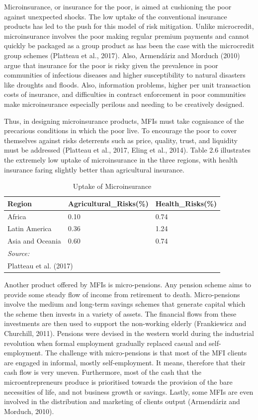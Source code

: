 \documentclass[a4paper, nobind]{templates/ociamthesis}
\begin{document}
Microinsurance, or insurance for the poor, is aimed at cushioning the poor against unexpected shocks. The low uptake of the conventional insurance products has led to the push for this model of risk mitigation. Unlike microcredit, microinsurance involves the poor making regular premium payments and cannot quickly be packaged as a group product as has been the case with the microcredit group schemes (Platteau et al., 2017). Also, Armendáriz and Morduch (2010) argue that insurance for the poor is risky given the prevalence in poor communities of infectious diseases and higher susceptibility to natural disasters like droughts and floods. Also, information problems, higher per unit transaction costs of insurance, and difficulties in contract enforcement in poor communities make microinsurance especially perilous and needing to be creatively designed.

Thus, in designing microinsurance products, MFIs must take cognisance of the precarious conditions in which the poor live. To encourage the poor to cover themselves against risks deterrents such as price, quality, trust, and liquidity must be addressed (Platteau et al., 2017, Eling et al., 2014). Table 2.6 illustrates the extremely low uptake of microinsurance in the three regions, with health insurance faring slightly better than agricultural insurance.

\begin{table}

\caption{\label{tab:unnamed-chunk-12}Uptake of Microinsurance}
\centering
\fontsize{8}{10}\selectfont
\begin{tabular}[t]{lll}
\toprule
Region & Agricultural\_Risks(\%) & Health\_Risks(\%)\\
\midrule
Africa & 0.10 & 0.74\\
Latin America & 0.36 & 1.24\\
Asia and Oceania & 0.60 & 0.74\\
\bottomrule
\multicolumn{3}{l}{\rule{0pt}{1em}\textit{Source: }}\\
\multicolumn{3}{l}{\rule{0pt}{1em}Platteau et al. (2017)}\\
\end{tabular}
\end{table}

Another product offered by MFIs is micro-pensions. Any pension scheme aims to provide some steady flow of income from retirement to death. Micro-pensions involve the medium and long-term savings schemes that generate capital which the scheme then invests in a variety of assets. The financial flows from these investments are then used to support the non-working elderly (Frankiewicz and Churchill, 2011). Pensions were devised in the western world during the industrial revolution when formal employment gradually replaced casual and self-employment. The challenge with micro-pensions is that most of the MFI clients are engaged in informal, mostly self-employment. It means, therefore that their cash flow is very uneven. Furthermore, most of the cash that the microentrepreneurs produce is prioritised towards the provision of the bare necessities of life, and not business growth or savings. Lastly, some MFIs are even involved in the distribution and marketing of clients output (Armendáriz and Morduch, 2010).
\end{document}
